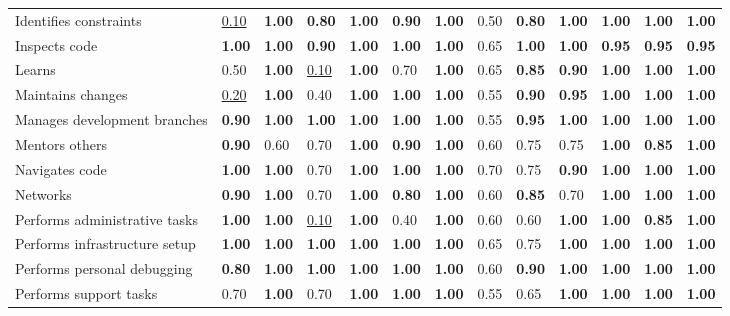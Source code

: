 \begin{tabular}{lllllllllllll}
Identifies constraints & \underline{0.10} & \textbf{1.00} & \textbf{0.80} & \textbf{1.00} & \textbf{0.90} & \textbf{1.00} & 0.50 & \textbf{0.80} & \textbf{1.00} & \textbf{1.00} & \textbf{1.00} & \textbf{1.00} \\
Inspects code & \textbf{1.00} & \textbf{1.00} & \textbf{0.90} & \textbf{1.00} & \textbf{1.00} & \textbf{1.00} & 0.65 & \textbf{1.00} & \textbf{1.00} & \textbf{0.95} & \textbf{0.95} & \textbf{0.95} \\
Learns & 0.50 & \textbf{1.00} & \underline{0.10} & \textbf{1.00} & 0.70 & \textbf{1.00} & 0.65 & \textbf{0.85} & \textbf{0.90} & \textbf{1.00} & \textbf{1.00} & \textbf{1.00} \\
Maintains changes & \underline{0.20} & \textbf{1.00} & 0.40 & \textbf{1.00} & \textbf{1.00} & \textbf{1.00} & 0.55 & \textbf{0.90} & \textbf{0.95} & \textbf{1.00} & \textbf{1.00} & \textbf{1.00} \\
Manages development branches & \textbf{0.90} & \textbf{1.00} & \textbf{1.00} & \textbf{1.00} & \textbf{1.00} & \textbf{1.00} & 0.55 & \textbf{0.95} & \textbf{1.00} & \textbf{1.00} & \textbf{1.00} & \textbf{1.00} \\
Mentors others & \textbf{0.90} & 0.60 & 0.70 & \textbf{1.00} & \textbf{0.90} & \textbf{1.00} & 0.60 & 0.75 & 0.75 & \textbf{1.00} & \textbf{0.85} & \textbf{1.00} \\
Navigates code & \textbf{1.00} & \textbf{1.00} & 0.70 & \textbf{1.00} & \textbf{1.00} & \textbf{1.00} & 0.70 & 0.75 & \textbf{0.90} & \textbf{1.00} & \textbf{1.00} & \textbf{1.00} \\
Networks & \textbf{0.90} & \textbf{1.00} & 0.70 & \textbf{1.00} & \textbf{0.80} & \textbf{1.00} & 0.60 & \textbf{0.85} & 0.70 & \textbf{1.00} & \textbf{1.00} & \textbf{1.00} \\
Performs administrative tasks & \textbf{1.00} & \textbf{1.00} & \underline{0.10} & \textbf{1.00} & 0.40 & \textbf{1.00} & 0.60 & 0.60 & \textbf{1.00} & \textbf{1.00} & \textbf{0.85} & \textbf{1.00} \\
Performs infrastructure setup & \textbf{1.00} & \textbf{1.00} & \textbf{1.00} & \textbf{1.00} & \textbf{1.00} & \textbf{1.00} & 0.65 & 0.75 & \textbf{1.00} & \textbf{1.00} & \textbf{1.00} & \textbf{1.00} \\
Performs personal debugging & \textbf{0.80} & \textbf{1.00} & \textbf{1.00} & \textbf{1.00} & \textbf{1.00} & \textbf{1.00} & 0.60 & \textbf{0.90} & \textbf{1.00} & \textbf{1.00} & \textbf{1.00} & \textbf{1.00} \\
Performs support tasks & 0.70 & \textbf{1.00} & 0.70 & \textbf{1.00} & \textbf{1.00} & \textbf{1.00} & 0.55 & 0.65 & \textbf{1.00} & \textbf{1.00} & \textbf{1.00} & \textbf{1.00} \\

\end{tabular}
